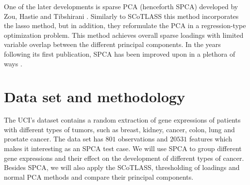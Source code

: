\documentclass[10pt,letterpaper]{article}
\begin{document}
One of the later developments is sparse PCA (henceforth SPCA) developed by Zou, Hastie and Tibshirani \citeyear{Zou2006}. Similarly to SCoTLASS this method incorporates the lasso method, but in addition, they reformulate the PCA in a regression-type optimization problem. This method achieves overall sparse loadings with limited variable overlap between the different principal components. In the years following its first publication, SPCA has been improved upon in a plethora of ways \cite{Shen2008, Journee2010}.

\section*{Data set and methodology}
The UCI's dataset contains a random extraction of gene expressions of patients with different types of tumors, such as breast, kidney, cancer, colon, lung and prostate cancer. The data set has $801$ observations and $20531$ features which makes it interesting as an SPCA test case. We will use SPCA to group different gene expressions and their effect on the development of different types of cancer. Besides SPCA, we will also apply the SCoTLASS, thresholding of loadings and normal PCA methods and compare their principal components.

\pagebreak


\end{document}
